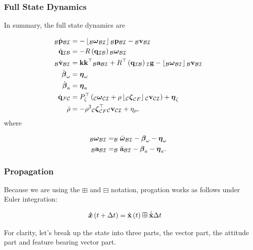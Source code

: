 \documentclass{beamer}
\begin{document}
\begin{frame}
\frametitle{Full State Dynamics}
In summary, the full state dynamics are

\begin{align}
_{\mathcal{B}}\dot{{\bf p}}_{\mathcal{B}\mathcal{I}} & =-\left\lfloor _{\mathcal{B}}\boldsymbol{\omega}_{\mathcal{B}\mathcal{I}}\right\rfloor {}_{\mathcal{B}}{\bf p}_{\mathcal{B}\mathcal{I}}-{}_{\mathcal{B}}{\bf v}_{\mathcal{B}\mathcal{I}}\\
\dot{{\bf q}}_{\mathcal{I}\mathcal{B}} & =-R\left({\bf q}_{\mathcal{I}\mathcal{B}}\right){}_{\mathcal{B}}\boldsymbol{\omega}_{\mathcal{B}\mathcal{I}}\\
_{\mathcal{B}}\dot{{\bf v}}_{\mathcal{B}\mathcal{I}} & ={\bf k}{\bf k}^{\top}{}_{\mathcal{B}}{\bf a}_{\mathcal{B}\mathcal{I}}+R^{\top}\left({\bf q}_{\mathcal{I}\mathcal{B}}\right){}_{\mathcal{I}}{\bf g}-\left\lfloor _{\mathcal{B}}\boldsymbol{\omega}_{\mathcal{B}\mathcal{I}}\right\rfloor {}_{\mathcal{B}}{\bf v}_{\mathcal{B}\mathcal{I}}\\
\dot{\boldsymbol{\beta}}_{\omega} & =\boldsymbol{\eta}_{\omega}\\
\dot{\boldsymbol{\beta}}_{a} & =\boldsymbol{\eta}_{a}\\
\dot{{\bf q}}_{\mathcal{F}\mathcal{C}} & =P_{\zeta}^{\top}\left(_{\mathcal{C}}\boldsymbol{\omega}_{\mathcal{C}\mathcal{I}}+\rho\left\lfloor _{\mathcal{C}}\boldsymbol{\zeta}_{\mathcal{C}F}\right\rfloor {}_{\mathcal{C}}{\bf v}_{\mathcal{C}\mathcal{I}}\right)+\boldsymbol{\eta}_{\zeta}\\
\dot{\rho} & =-\rho^{2}{}_{\mathcal{C}}\boldsymbol{\zeta}_{\mathcal{C}F}^{\top}{}_{\mathcal{C}}{\bf v}_{\mathcal{C}\mathcal{I}}+\eta_{\rho},
\end{align}
where

\begin{align}
_{\mathcal{B}}\boldsymbol{\omega}_{\mathcal{B}\mathcal{I}} & =_{\mathcal{B}}\bar{\boldsymbol{\omega}}_{\mathcal{B}\mathcal{I}}-\boldsymbol{\beta}_{\omega}-\boldsymbol{\eta}_{\omega}\\
_{\mathcal{B}}{\bf a}_{\mathcal{B}\mathcal{I}} & =_{\mathcal{B}}\bar{{\bf a}}_{\mathcal{B}\mathcal{I}}-\boldsymbol{\beta}_{a}-\boldsymbol{\eta}_{a}.
\end{align}
\end{frame}



\begin{frame}
\frametitle{Propagation}
Because we are using the $\boxplus$ and $\boxminus$ notation, progation
works as follows under Euler integration:

\begin{align}
\boldsymbol{\hat{x}}\left(t+\Delta t\right) & =\hat{{\bf x}}\left(t\right)\boxplus\dot{\hat{{\bf x}}}\Delta t
\end{align}


For clarity, let's break up the state into three parts, the vector
part, the attitude part and feature bearing vector part.
\end{frame}
\end{document}
